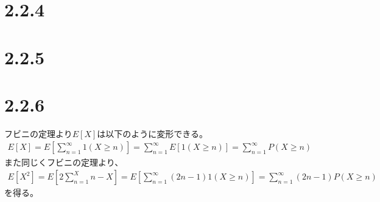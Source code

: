 \documentclass{article}
\begin{document}
\section{2.2.4}

\section{2.2.5}



\section{2.2.6}
フビニの定理より$E[X]$は以下のように変形できる。
\begin{align*}
	E\left[ X \right] = E\left[ \sum_{n = 1}^{\infty} 1(X \geq n) \right] = \sum_{n = 1}^{\infty} E[1(X \geq n)] = \sum_{n = 1}^{\infty} P(X \geq n)
\end{align*}
また同じくフビニの定理より、
\begin{align*}
	E[X^2] = E\left[ 2 \sum_{n=1}^X n - X \right] = E\left[ \sum_{n=1}^{\infty} (2n-1) 1(X \geq n) \right] = \sum_{n=1}^{\infty} (2n-1) P(X \geq n)
\end{align*}
を得る。
\end{document}
